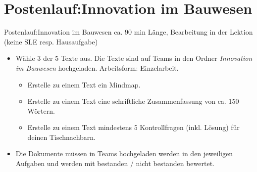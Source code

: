 \section{Postenlauf:Innovation im Bauwesen}
\begin{frame}{Postenlauf:Innovation im Bauwesen}
    ca. 90 min Länge, Bearbeitung in der Lektion (keine SLE resp. Hausaufgabe)
    \begin{itemize}
        \item [\textbullet] Wähle 3 der 5 Texte aus. Die Texte sind auf Teams in den Ordner \textit{Innovation im Bauwesen} hochgeladen. Arbeitsform: Einzelarbeit.
        \begin{itemize}
            \item [\textbullet] Erstelle zu einem Text ein Mindmap. 
            \item [\textbullet] Erstelle zu einem Text eine schriftliche Zusammenfassung von ca. 150 Wörtern.
            \item [\textbullet] Erstelle zu einem Text mindestens 5 Kontrollfragen (inkl. Lösung) für deinen Tischnachbarn.
        \end{itemize}
        \item [\textbullet] Die Dokumente müssen in Teams hochgeladen  werden in den jeweiligen Aufgaben und werden mit bestanden / nicht bestanden bewertet.
    \end{itemize}
    \end{frame}
